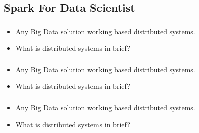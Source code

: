 
\subsection{Spark For Data Scientist}




\begin{frame}
  \frametitle{\subsecname}
	\begin{itemize}[<+->]
		\item Any Big Data solution working based distributed systems.
		\item What is distributed systems in brief?
	\end{itemize}
\end{frame}


\begin{frame}
  \frametitle{\subsecname}
	\begin{itemize}[<+->]
		\item Any Big Data solution working based distributed systems.
		\item What is distributed systems in brief?
	\end{itemize}
\end{frame}



\begin{frame}
  \frametitle{\subsecname}
	\begin{itemize}[<+->]
		\item Any Big Data solution working based distributed systems.
		\item What is distributed systems in brief?
	\end{itemize}
\end{frame}

